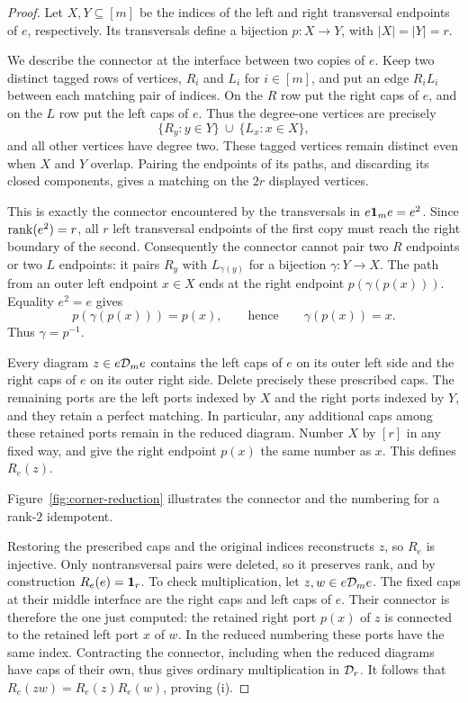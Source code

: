 \begin{proof}
Let $X,Y\subseteq[m]$ be the indices of the left and right transversal
endpoints of $e$, respectively.  Its transversals define a bijection
$p:X\to Y$, with $|X|=|Y|=r$.

We describe the connector at the interface between two copies of $e$.
Keep two distinct tagged rows of vertices, $R_i$ and $L_i$ for
$i\in[m]$, and put an edge $R_iL_i$ between each matching pair of
indices.  On the $R$ row put the right caps of $e$, and on the $L$ row
put the left caps of $e$.  Thus the degree-one vertices are precisely
\[
  \{R_y:y\in Y\}\ \cup\ \{L_x:x\in X\},
\]
and all other vertices have degree two.  These tagged vertices remain
distinct even when $X$ and $Y$ overlap.  Pairing the endpoints of its
paths, and discarding its closed components, gives a matching on the
$2r$ displayed vertices.

This is exactly the connector encountered by the transversals in
$e\mathbf 1_m e=e^2$.  Since $\operatorname{rank}(e^2)=r$, all $r$ left transversal
endpoints of the first copy must reach the right boundary of the second.
Consequently the connector cannot pair two $R$ endpoints or two $L$
endpoints: it pairs $R_y$ with $L_{\gamma(y)}$ for a bijection
$\gamma:Y\to X$.  The path from an outer left endpoint $x\in X$
ends at the right endpoint $p(\gamma(p(x)))$.  Equality $e^2=e$ gives
\[
  p(\gamma(p(x)))=p(x),
  \qquad\text{hence}\qquad \gamma(p(x))=x.
\]
Thus $\gamma=p^{-1}$.

Every diagram $z\in e\mathcal D_{m}e$ contains the left caps of $e$ on its
outer left side and the right caps of $e$ on its outer right side.
Delete precisely these prescribed caps.  The remaining ports are the
left ports indexed by $X$ and the right ports indexed by $Y$, and they
retain a perfect matching.  In particular, any additional caps among
these retained ports remain in the reduced diagram.  Number $X$ by
$[r]$ in any fixed way, and give the right endpoint $p(x)$ the same
number as $x$.  This defines $R_e(z)$.

Figure~\ref{fig:corner-reduction} illustrates the connector and the
numbering for a rank-$2$ idempotent.


Restoring the prescribed caps and the original indices reconstructs
$z$, so $R_e$ is injective.  Only nontransversal pairs were deleted,
so it preserves rank, and by construction $R_e(e)=\mathbf 1_r$.
To check multiplication, let $z,w\in e\mathcal D_{m}e$.  The fixed caps at
their middle interface are the right caps and left caps of $e$.
Their connector is therefore the one just computed: the retained right
port $p(x)$ of $z$ is connected to the retained left port $x$ of $w$.
In the reduced numbering these ports have the same index.
Contracting the connector, including when the reduced diagrams have
caps of their own, thus gives ordinary multiplication in $\mathcal D_{r}$.
It follows that $R_e(zw)=R_e(z)R_e(w)$, proving (i).


\end{proof}
